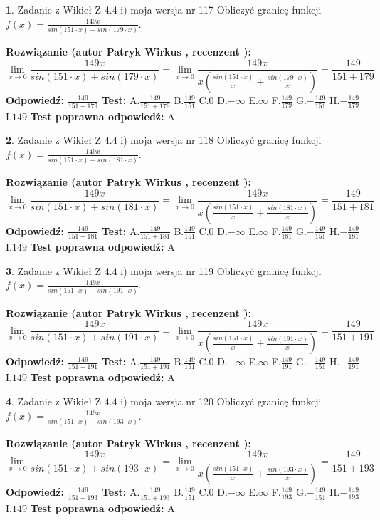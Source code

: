 \documentclass[12pt, a4paper]{article}
\theoremstyle{definition} %
\newtheorem{zad}{}
\newcommand{\zadStart}[1]{\begin{zad}#1\newline}
\newcommand{\zadStop}{\end{zad}}
\newcommand{\rozwStart}[2]{\noindent \textbf{Rozwiązanie (autor #1 , recenzent #2): }\newline}
\newcommand{\rozwStop}{\newline}
\newcommand{\odpStart}{\noindent \textbf{Odpowiedź:}\newline}
\newcommand{\odpStop}{\newline}
\newcommand{\testStart}{\noindent \textbf{Test:}\newline}
\newcommand{\testStop}{\newline}
\newcommand{\kluczStart}{\noindent \textbf{Test poprawna odpowiedź:}\newline}
\newcommand{\kluczStop}{\newline}
\begin{document}
\zadStart{Zadanie z Wikieł Z 4.4 i) moja wersja nr 117}
Obliczyć granicę funkcji $f(x)=\frac{149x}{sin(151\cdot x) +sin(179\cdot x)}$.
\zadStop
\rozwStart{Patryk Wirkus}{}
$$\lim\limits_{x\to 0}\frac{149x}{sin(151\cdot x) +sin(179\cdot x)}=\lim\limits_{x\to 0}\frac{149x}{x(\frac{sin(151\cdot x)}{x}+\frac{sin(179\cdot x)}{x})}=\frac{149}{151+179}$$
\rozwStop
\odpStart
$\frac{149}{151+179}$
\odpStop
\testStart
A.$\frac{149}{151+179}$
B.$\frac{149}{151}$
C.$0$
D.$-\infty$
E.$\infty$
F.$\frac{149}{179}$
G.$-\frac{149}{151}$
H.$-\frac{149}{179}$
I.$149$
\testStop
\kluczStart
A
\kluczStop



\zadStart{Zadanie z Wikieł Z 4.4 i) moja wersja nr 118}
Obliczyć granicę funkcji $f(x)=\frac{149x}{sin(151\cdot x) +sin(181\cdot x)}$.
\zadStop
\rozwStart{Patryk Wirkus}{}
$$\lim\limits_{x\to 0}\frac{149x}{sin(151\cdot x) +sin(181\cdot x)}=\lim\limits_{x\to 0}\frac{149x}{x(\frac{sin(151\cdot x)}{x}+\frac{sin(181\cdot x)}{x})}=\frac{149}{151+181}$$
\rozwStop
\odpStart
$\frac{149}{151+181}$
\odpStop
\testStart
A.$\frac{149}{151+181}$
B.$\frac{149}{151}$
C.$0$
D.$-\infty$
E.$\infty$
F.$\frac{149}{181}$
G.$-\frac{149}{151}$
H.$-\frac{149}{181}$
I.$149$
\testStop
\kluczStart
A
\kluczStop



\zadStart{Zadanie z Wikieł Z 4.4 i) moja wersja nr 119}
Obliczyć granicę funkcji $f(x)=\frac{149x}{sin(151\cdot x) +sin(191\cdot x)}$.
\zadStop
\rozwStart{Patryk Wirkus}{}
$$\lim\limits_{x\to 0}\frac{149x}{sin(151\cdot x) +sin(191\cdot x)}=\lim\limits_{x\to 0}\frac{149x}{x(\frac{sin(151\cdot x)}{x}+\frac{sin(191\cdot x)}{x})}=\frac{149}{151+191}$$
\rozwStop
\odpStart
$\frac{149}{151+191}$
\odpStop
\testStart
A.$\frac{149}{151+191}$
B.$\frac{149}{151}$
C.$0$
D.$-\infty$
E.$\infty$
F.$\frac{149}{191}$
G.$-\frac{149}{151}$
H.$-\frac{149}{191}$
I.$149$
\testStop
\kluczStart
A
\kluczStop



\zadStart{Zadanie z Wikieł Z 4.4 i) moja wersja nr 120}
Obliczyć granicę funkcji $f(x)=\frac{149x}{sin(151\cdot x) +sin(193\cdot x)}$.
\zadStop
\rozwStart{Patryk Wirkus}{}
$$\lim\limits_{x\to 0}\frac{149x}{sin(151\cdot x) +sin(193\cdot x)}=\lim\limits_{x\to 0}\frac{149x}{x(\frac{sin(151\cdot x)}{x}+\frac{sin(193\cdot x)}{x})}=\frac{149}{151+193}$$
\rozwStop
\odpStart
$\frac{149}{151+193}$
\odpStop
\testStart
A.$\frac{149}{151+193}$
B.$\frac{149}{151}$
C.$0$
D.$-\infty$
E.$\infty$
F.$\frac{149}{193}$
G.$-\frac{149}{151}$
H.$-\frac{149}{193}$
I.$149$
\testStop
\kluczStart
A
\kluczStop
\end{document}
